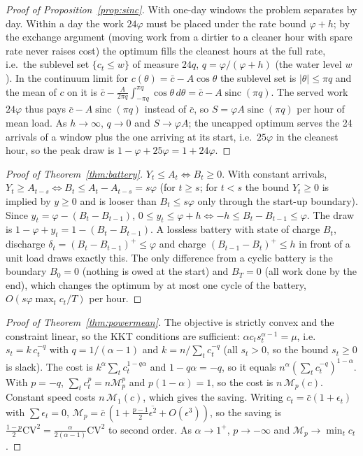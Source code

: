 \documentclass[acmsmall,review,anonymous]{acmart}
\theoremstyle{definition}
\newcommand{\Mp}{\mathcal{M}}
\newcommand{\sinc}{\operatorname{sinc}}
\begin{document}
\begin{proof}[Proof of Proposition~\ref{prop:sinc}]
With one-day windows the problem separates by day. Within a day the work $24\varphi$ must be
placed under the rate bound $\varphi+h$; by the exchange argument (moving work from a dirtier
to a cleaner hour with spare rate never raises cost) the optimum fills the cleanest hours at the
full rate, i.e.\ the sublevel set $\{c_t\le w\}$ of measure $24q$, $q=\varphi/(\varphi+h)$ (the
water level $w$). In the continuum limit for $c(\theta)=\bar c-A\cos\theta$ the sublevel set is
$|\theta|\le\pi q$ and the mean of $c$ on it is
$\bar c-\frac{A}{2\pi q}\int_{-\pi q}^{\pi q}\cos\theta\,d\theta=\bar c-A\sinc(\pi q)$. The served
work $24\varphi$ thus pays $\bar c-A\sinc(\pi q)$ instead of $\bar c$, so
$S=\varphi A\sinc(\pi q)$ per hour of mean load. As $h\to\infty$, $q\to0$ and $S\to\varphi A$; the
uncapped optimum serves the 24 arrivals of a window plus the one arriving at its start,
i.e.\ $25\varphi$ in the cleanest hour, so the peak draw is $1-\varphi+25\varphi=1+24\varphi$.
\end{proof}

\begin{proof}[Proof of Theorem~\ref{thm:battery}]
$Y_t\le A_t\iff B_t\ge0$. With constant arrivals, $Y_t\ge A_{t-s}\iff B_t\le A_t-A_{t-s}=s\varphi$
(for $t\ge s$; for $t<s$ the bound $Y_t\ge0$ is implied by $y\ge0$ and is looser than
$B_t\le s\varphi$ only through the start-up boundary). Since $y_t=\varphi-(B_t-B_{t-1})$,
$0\le y_t\le\varphi+h\iff-h\le B_t-B_{t-1}\le\varphi$. The draw is
$1-\varphi+y_t=1-(B_t-B_{t-1})$. A lossless battery with state of charge $B_t$, discharge
$\delta_t=(B_t-B_{t-1})^+\le\varphi$ and charge $(B_{t-1}-B_t)^+\le h$ in front of a unit load
draws exactly this. The only difference from a cyclic battery is the boundary
$B_0=0$ (nothing is owed at the start) and $B_T=0$ (all work done by the end), which changes
the optimum by at most one cycle of the battery, $O(s\varphi\max_t c_t/T)$ per hour.
\end{proof}

\begin{proof}[Proof of Theorem~\ref{thm:powermean}]
The objective is strictly convex and the constraint linear, so the KKT conditions are
sufficient: $\alpha c_t s_t^{\alpha-1}=\mu$, i.e.\ $s_t=k\,c_t^{-q}$ with $q=1/(\alpha-1)$ and
$k=n/\sum_t c_t^{-q}$ (all $s_t>0$, so the bound $s_t\ge0$ is slack). The cost is
$k^\alpha\sum_t c_t^{1-q\alpha}$ and $1-q\alpha=-q$, so it equals
$n^\alpha(\sum_t c_t^{-q})^{1-\alpha}$. With $p=-q$, $\sum_tc_t^{p}=n\Mp_p^p$ and
$p(1-\alpha)=1$, so the cost is $n\,\Mp_p(c)$. Constant speed costs $n\,\Mp_1(c)$, which gives
the saving. Writing $c_t=\bar c(1+\epsilon_t)$ with $\sum\epsilon_t=0$,
$\Mp_p=\bar c\,(1+\frac{p-1}{2}\overline{\epsilon^2}+O(\epsilon^3))$, so the saving is
$\frac{1-p}{2}\mathrm{CV}^2=\frac{\alpha}{2(\alpha-1)}\mathrm{CV}^2$ to second order. As
$\alpha\to1^+$, $p\to-\infty$ and $\Mp_p\to\min_t c_t$.
\end{proof}
\end{document}
